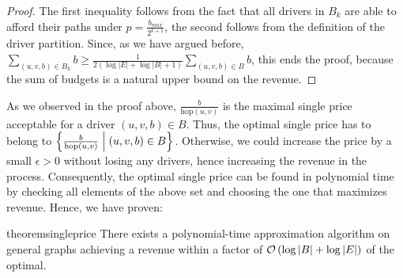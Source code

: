 \begin{proof}
    The first inequality follows from the fact that all drivers in $B_k$ are able to afford their paths under $p = \frac{b_{max}}{2^{k+1}}$,
    the second follows from the definition of the driver partition.
    Since, as we have argued before, $\sum_{(u, v, b) \in B_k} b \geq \frac{1}{2(\log |E| + \log |B| + 1)} \sum_{(u, v, b) \in B} b$,
    this ends the proof, because the sum of budgets is a natural upper bound on the revenue.
\end{proof}

As we observed in the proof above, $\frac{b}{\mathrm{hop}(u, v)}$ is the maximal single price acceptable for a driver $(u, v, b) \in B$.
Thus, the optimal single price has to belong to $\left\{ \frac{b}{\mathrm{hop}(u, v)} \; \middle| \; (u, v, b) \in B \right\}$.
Otherwise, we could increase the price by a small $\epsilon > 0$ without losing any drivers, hence increasing the revenue in the process.
Consequently, the optimal single price can be found in polynomial time by checking all elements of the above set and
choosing the one that maximizes revenue.
Hence, we have proven:

\begin{restatable}{theorem}{singleprice}\label{thm:single_price}
There exists a polynomial-time approximation algorithm on general graphs achieving a revenue within a factor of $ \mathcal{O} \left( \log |B| + \log |E| \right)$ of the optimal.
\end{restatable}